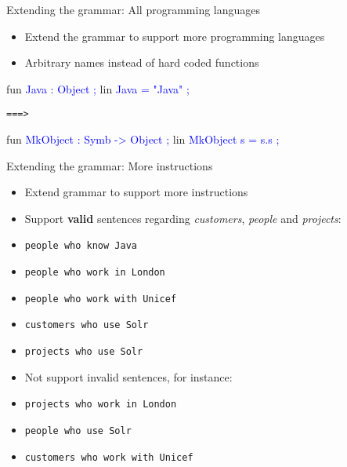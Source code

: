 \begin{frame}[fragile]{Extending the grammar: All programming languages}
\begin{itemize}
\item Extend the grammar to support more programming languages\pause
\item Arbitrary names instead of hard coded functions
\end{itemize}
\begin{semiverbatim}
fun
  \textcolor{Blue}{Java : Object ; }
lin
  \textcolor{Blue}{Java = \textcolor{String}{"Java"} ; }
\end{semiverbatim}\pause

\texttt{===>}

\begin{semiverbatim}
fun
  \textcolor{Blue}{MkObject : Symb -> Object ; }
lin
  \textcolor{Blue}{MkObject s = s.s ; }
\end{semiverbatim}
\end{frame}
\begin{frame}[fragile]{Extending the grammar: More instructions}
\begin{itemize}
\item Extend grammar to support more instructions\pause
\item Support \textbf{valid} sentences regarding \emph{customers}, \emph{people} and \emph{projects}:\pause
\end{itemize}
  \vspace{-4mm}\begin{itemize}
    \item[] \texttt{people who know Java}
    \item[] \texttt{people who work in London}
    \item[] \texttt{people who work with Unicef}
    \item[] \texttt{customers who use Solr}
    \item[] \texttt{projects who use Solr}
  \end{itemize}\pause
  \begin{itemize}
    \item Not support invalid sentences, for instance:
  \end{itemize}
   \vspace{-4mm}\begin{itemize}
    \item[] \texttt{projects who work in London}
    \item[] \texttt{people who use Solr}
    \item[] \texttt{customers who work with Unicef}
  \end{itemize}
\end{frame}

